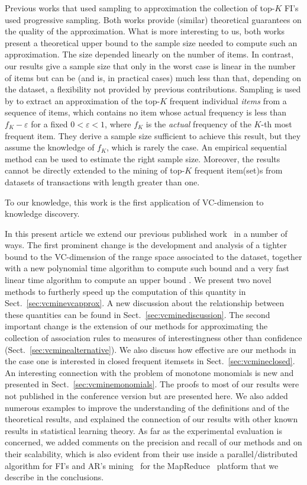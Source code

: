 Previous works that used sampling to approximation the collection of top-$K$
FI's~\cite{SchefferW02,PietracaprinaRUV10} used progressive sampling. Both
works provide (similar) theoretical guarantees on the quality of the
approximation. What is more interesting to us, both works present a theoretical
upper bound to the sample size needed to compute such an approximation. The size
depended linearly on the number of items. 
In contrast, our results give a sample size that only in the worst case is
linear in the number of items but can be (and is, in practical cases) much less
than that, depending on the dataset, a flexibility not provided by previous
contributions. 
Sampling is used by \citet{VasudevanV09} to extract
an approximation of the top-$K$ frequent individual \emph{items} from a sequence
of items, which contains no item whose actual frequency is less than
$f_K-\varepsilon$ for a fixed $0<\varepsilon<1$, where $f_K$ is the
\emph{actual} frequency of the $K$-th most frequent item. They derive a sample
size sufficient to achieve this result, but they assume the knowledge of $f_K$,
which is rarely the case. An empirical sequential method can be used to estimate
the right sample size. Moreover, the results cannot be directly extended to the
mining of top-$K$ frequent item(set)s from datasets of transactions with length
greater than one.

 To our knowledge, this work is the
first application of VC-dimension to knowledge discovery.

In this present article we extend our previous published work~\cite{RiondatoU12}
in a number of ways. The first prominent change is the development and analysis
of a tighter bound to the VC-dimension of the range space associated to the
dataset, together with a new polynomial time algorithm to compute such bound and
a very fast linear time algorithm to compute an upper bound
. We present two novel methods to furtherly speed up the computation of this
quantity in Sect.~\ref{sec:vcminevcapprox}. A new discussion about
the relationship between these quantities can be found in
Sect.~\ref{sec:vcminediscussion}. The second important change is the extension of our
methods for approximating the collection of association rules to measures of
interestingness other than confidence (Sect.~\ref{sec:vcminealternative}). We also
discuss how effective are our methods in the case one is interested in closed
frequent itemsets in Sect.~\ref{sec:vcmineclosed}. An interesting connection with the
problem of monotone monomials is new and presented in Sect.~\ref{sec:vcminemonomials}.
The proofs to most of our results were not published in the conference version
but are presented here. We also added numerous examples to improve the
understanding of the definitions and of the theoretical results, and explained
the connection of our results with other known results in statistical learning
theory. As far as the experimental evaluation is concerned, we added comments on
the precision and recall of our methods and on their scalability, which is also
evident from their use inside a parallel/distributed algorithm for FI's and AR's
mining~\cite{RiondatoDFU12} for the MapReduce~\cite{DeanS04} platform that we
describe in the conclusions.

